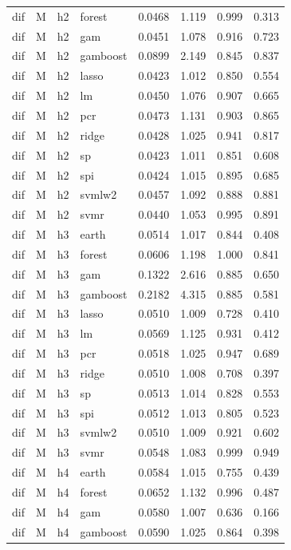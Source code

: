 \begin{ThreePartTable}
\begin{longtable}[t]{llclcccc}
dif & M & h2 & forest & 0.0468 & 1.119 & 0.999 & 0.313\\
dif & M & h2 & gam & 0.0451 & 1.078 & 0.916 & 0.723\\
dif & M & h2 & gamboost & 0.0899 & 2.149 & 0.845 & 0.837\\
dif & M & h2 & lasso & 0.0423 & 1.012 & 0.850 & 0.554\\
dif & M & h2 & lm & 0.0450 & 1.076 & 0.907 & 0.665\\
dif & M & h2 & pcr & 0.0473 & 1.131 & 0.903 & 0.865\\
dif & M & h2 & ridge & 0.0428 & 1.025 & 0.941 & 0.817\\
dif & M & h2 & sp & 0.0423 & 1.011 & 0.851 & 0.608\\
dif & M & h2 & spi & 0.0424 & 1.015 & 0.895 & 0.685\\
dif & M & h2 & svmlw2 & 0.0457 & 1.092 & 0.888 & 0.881\\
dif & M & h2 & svmr & 0.0440 & 1.053 & 0.995 & 0.891\\
\addlinespace
dif & M & h3 & earth & 0.0514 & 1.017 & 0.844 & 0.408\\
dif & M & h3 & forest & 0.0606 & 1.198 & 1.000 & 0.841\\
dif & M & h3 & gam & 0.1322 & 2.616 & 0.885 & 0.650\\
dif & M & h3 & gamboost & 0.2182 & 4.315 & 0.885 & 0.581\\
dif & M & h3 & lasso & 0.0510 & 1.009 & 0.728 & 0.410\\
dif & M & h3 & lm & 0.0569 & 1.125 & 0.931 & 0.412\\
dif & M & h3 & pcr & 0.0518 & 1.025 & 0.947 & 0.689\\
dif & M & h3 & ridge & 0.0510 & 1.008 & 0.708 & 0.397\\
dif & M & h3 & sp & 0.0513 & 1.014 & 0.828 & 0.553\\
dif & M & h3 & spi & 0.0512 & 1.013 & 0.805 & 0.523\\
dif & M & h3 & svmlw2 & 0.0510 & 1.009 & 0.921 & 0.602\\
dif & M & h3 & svmr & 0.0548 & 1.083 & 0.999 & 0.949\\
\addlinespace
dif & M & h4 & earth & 0.0584 & 1.015 & 0.755 & 0.439\\
dif & M & h4 & forest & 0.0652 & 1.132 & 0.996 & 0.487\\
dif & M & h4 & gam & 0.0580 & 1.007 & 0.636 & 0.166\\
dif & M & h4 & gamboost & 0.0590 & 1.025 & 0.864 & 0.398\\

\end{longtable}
\end{ThreePartTable}
